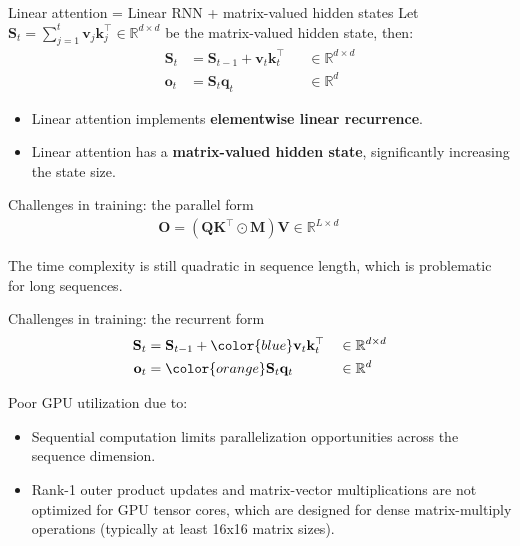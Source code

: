 \begin{frame}{Linear attention = Linear RNN + matrix-valued hidden states}
    Let $\mathbf{S}_t = \sum_{j=1}^t\mathbf{v}_j\mathbf{k}_j^\top \in \mathbb{R}^{d \times d}$ be the matrix-valued hidden state, then:
    $$ \begin{aligned}
        \mathbf{S}_t &= \mathbf{S}_{t-1} + \mathbf{v}_t\mathbf{k}_t^\top &&\in \mathbb{R}^{d \times d}  \\
        \mathbf{o}_t &= \mathbf{S}_t\mathbf{q}_t &&\in \mathbb{R}^d  
    \end{aligned} $$
    
\begin{itemize}
    \item Linear attention implements {\color{red}\textbf{elementwise linear recurrence}}.
    \item Linear attention has a {\color{red}\textbf{matrix-valued hidden state}}, significantly increasing the state size.
\end{itemize}
\end{frame}
\begin{frame}{Challenges in training: the parallel form}
    \centering
    \begin{align*}
        \mathbf{O}= (\mathbf{Q}\mathbf{K}^\top \odot \mathbf{M})\mathbf{V} \in \mathbb{R}^{L\times d} &&
    \end{align*}
    \vspace{2mm}

    The time complexity is still quadratic in sequence length, which is problematic for long sequences.
\end{frame}

\begin{frame}{Challenges in training: the recurrent form}
    \[
    \begin{aligned}
        \mathbf{S}_t &= \mathbf{S}_{t-1} + {\color{blue}\mathbf{v}_t\mathbf{k}_t^\top} &&\in \mathbb{R}^{d \times d}  \\
        \mathbf{o}_t &= {\color{orange}\mathbf{S}_t\mathbf{q}_t} &&\in \mathbb{R}^d  
    \end{aligned}
    \]

     Poor GPU utilization due to:
        \begin{itemize}
            \item Sequential computation limits parallelization opportunities across the sequence dimension.
            \item {\color{blue}Rank-1 outer product updates} and {\color{orange}matrix-vector multiplications} are not optimized for GPU tensor cores, which are designed for dense matrix-multiply operations (typically at least 16x16 matrix sizes).
        \end{itemize}   
    
\end{frame}


